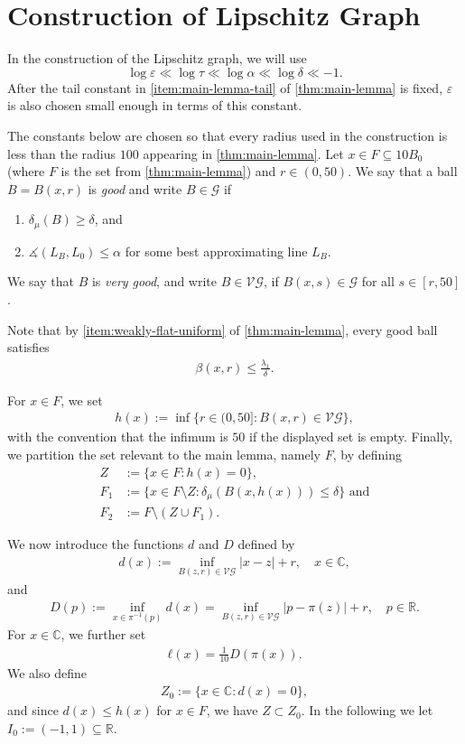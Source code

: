 \documentclass[11pt,a4paper,english,reqno]{amsart}
\newcommand{\G}{\mathcal{G}}
\newcommand{\VG}{\mathcal{VG}}
\numberwithin{equation}{section}
\newcommand{\RR}[0]{\mathbb{R}}
\newcommand{\CC}[0]{\mathbb{C}}
\renewcommand{\subset}{\subseteq}
\renewcommand{\angle}{\measuredangle}
\numberwithin{definition}{section}
\begin{document}
\section{Construction of Lipschitz Graph}\label{sec:graph-construction}
In the construction of the Lipschitz graph, we will use
\begin{equation}
  \log ε \ll \log τ \ll \log α \ll \log δ \ll -1.
\end{equation}
After the tail constant in \cref{item:main-lemma-tail} of \cref{thm:main-lemma} is fixed, $ε$ is also chosen small enough in terms of this constant.

The constants below are chosen so that every radius used in the construction is less than the radius $100$ appearing in \cref{thm:main-lemma}.
Let $x\in F\subset 10B_0$ (where $F$ is the set from \cref{thm:main-lemma}) and $r\in(0,50)$.
We say that a ball $B=B(x,r)$ is \emph{good} and write $B\in\G$ if
\begin{enumerate}
  \item $δ_μ(B)\ge δ$, and
  \item $\angle (L_B,L_0)\le α$ for some best approximating line $L_B$.
\end{enumerate}
We say that $B$ is \emph{very good}, and write $B\in\VG$, if $B(x,s)\in\G$ for all $s\in[r,50]$.

Note that by \cref{item:weakly-flat-uniform} of \cref{thm:main-lemma}, every good ball satisfies
\begin{align}
  β(x,r) \le \frac{λ_1}{δ}.
\end{align}

For $x\in F$, we set
\begin{align}
  h(x) := \inf\{r\in(0,50] : B(x,r)\in\VG  \},
\end{align}
with the convention that the infimum is $50$ if the displayed set is empty.
Finally, we partition the set relevant to the main lemma, namely $F$, by defining
\begin{align}
  Z &:= \{ x\in F : h(x) = 0 \}, \\
  F_1 &:= \{ x\in F\setminus Z : δ_μ(B(x,h(x))) \le δ \} \text{ and} \\
  F_2 &:= F \setminus (Z\cup F_1).
\end{align}

We now introduce the functions $d$ and $D$ defined by
\begin{align}
  d(x) := \inf_{B(z,r)\in\VG} |x-z| + r, \quad x\in\CC,
\end{align}
and
\begin{align}
  D(p) := \inf_{x\in π^{-1}(p)} d(x) = \inf_{B(z,r)\in\VG} |p-π(z)| + r,\quad p\in\RR.
\end{align}
For $x\in \CC$, we further set
\begin{align}
  ℓ(x)=\frac{1}{10}D(π(x)).
\end{align}
We also define
\begin{align}
  Z_0 := \{ x\in\CC : d(x) = 0 \},
\end{align}
and since $d(x)\le h(x)$ for $x\in F$, we have $Z⊂ Z_0$.
In the following we let $I_0 := (-1,1)\subset \RR$.
\end{document}
